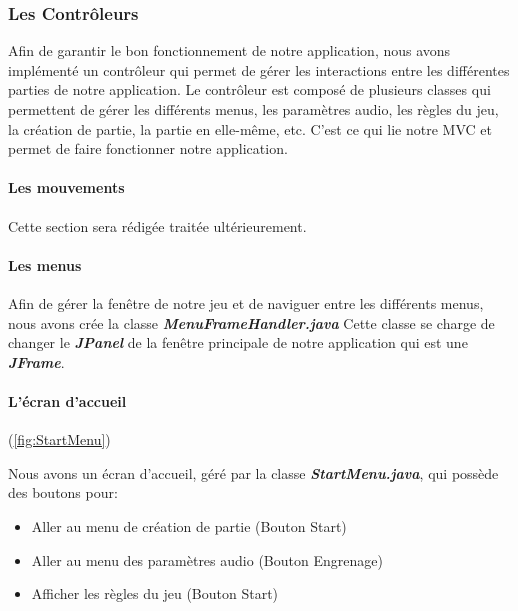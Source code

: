 \subsubsection{Les Contrôleurs}
\label{subsubsec:controleur}

Afin de garantir le bon fonctionnement de notre application, nous avons implémenté un contrôleur qui permet de gérer les interactions entre les différentes parties de notre application. Le contrôleur est composé de plusieurs classes qui permettent de gérer les différents menus, les paramètres audio, les règles du jeu, la création de partie, la partie en elle-même, etc. C'est ce qui lie notre MVC et permet de faire fonctionner notre application.

\paragraph{Les mouvements}

Cette section sera rédigée traitée ultérieurement.

\paragraph{Les menus}

Afin de gérer la fenêtre de notre jeu et de naviguer entre les différents menus, nous avons crée la classe \textbf{\textit{MenuFrameHandler.java}} Cette classe se charge de changer le \textbf{\textit{JPanel}} de la fenêtre principale de notre application qui est une \textbf{\textit{JFrame}}.

\paragraph{L'écran d'accueil} (\ref{fig:StartMenu})

Nous avons un écran d'accueil, géré par la classe \textbf{\textit{StartMenu.java}}, qui possède des boutons pour:

\begin{itemize}
    \item Aller au menu de création de partie (Bouton Start)
    \item Aller au menu des paramètres audio (Bouton Engrenage)
    \item Afficher les règles du jeu (Bouton Start)
\end{itemize}

